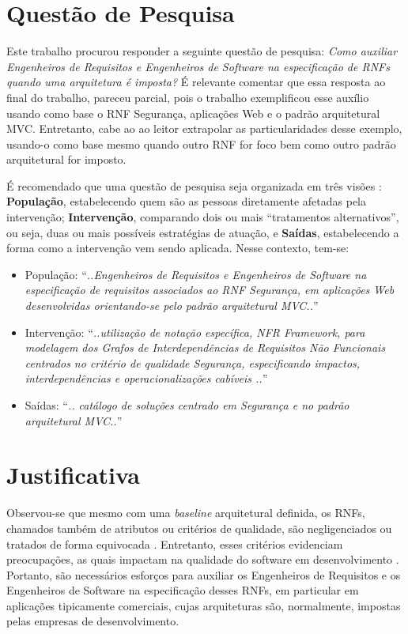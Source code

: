 \section{Questão de Pesquisa}
Este trabalho procurou responder a seguinte questão de pesquisa: \textit{Como auxiliar Engenheiros de Requisitos e Engenheiros de Software na especificação de RNFs quando uma arquitetura é imposta?} É relevante comentar que essa resposta ao final do trabalho, pareceu parcial, pois o trabalho exemplificou esse auxílio usando como base o RNF Segurança, aplicações Web e o padrão arquitetural MVC. Entretanto, cabe ao  ao leitor extrapolar as particularidades desse exemplo, usando-o como base mesmo quando outro RNF for foco bem como outro padrão arquitetural for imposto.

É recomendado que uma questão de pesquisa seja organizada em três visões \cite{keele2007guidelines}: 
\textbf{População}, estabelecendo quem são as pessoas diretamente afetadas pela intervenção; \textbf{Intervenção}, comparando dois ou mais “tratamentos alternativos”, ou seja, duas ou mais possíveis estratégias de atuação, e \textbf{Saídas}, estabelecendo a forma como a intervenção vem sendo aplicada. Nesse contexto, tem-se: 

\begin{itemize}
	\item População: “\textit{..Engenheiros de Requisitos e Engenheiros de Software na especificação de requisitos associados ao RNF Segurança, em aplicações Web desenvolvidas orientando-se pelo padrão arquitetural MVC..}”
	\item Intervenção: “\textit{..utilização de notação específica, NFR Framework, para modelagem dos Grafos de Interdependências de Requisitos Não Funcionais centrados no critério de qualidade Segurança, especificando impactos, interdependências e operacionalizações cabíveis  ..}”
	\item Saídas: “\textit{.. catálogo de soluções centrado em Segurança e no padrão arquitetural MVC..}”
\end{itemize}
\section{Justificativa}


Observou-se que mesmo com uma \textit{baseline}  arquitetural definida, os RNFs, chamados também de atributos ou critérios de qualidade, são negligenciados ou tratados de forma equivocada \cite{eckhardt2016non}. Entretanto, esses critérios evidenciam preocupações, as quais impactam na qualidade do software em desenvolvimento \cite{schneidewind1990standard}.  
Portanto, são necessários esforços para auxiliar os Engenheiros de Requisitos e os Engenheiros de Software na especificação desses RNFs, em particular em aplicações tipicamente comerciais, cujas arquiteturas são, normalmente, impostas pelas empresas de desenvolvimento.

